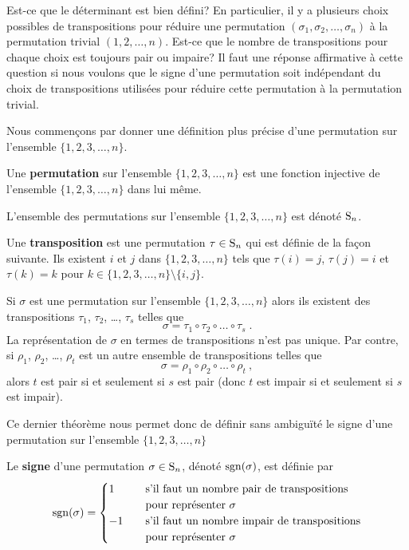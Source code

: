 {Est-ce que le déterminant est bien défini?  En particulier, il y a
plusieurs choix possibles de transpositions pour réduire une
permutation $(\sigma_1, \sigma_2, \ldots, \sigma_n)$ à la permutation
trivial $(1,2,\ldots,n)$.  Est-ce que le nombre de transpositions pour
chaque choix est toujours pair ou impaire?  Il faut une réponse
affirmative à cette question si nous voulons que le signe d'une permutation
soit indépendant du choix de transpositions utilisées pour réduire
cette permutation à la permutation trivial.

Nous commençons par donner une définition plus précise d'une permutation
sur l'ensemble $\{1,2,3,\ldots,n\}$.

\begin{focus}{\dfn}
Une {\bfseries permutation} sur l'ensemble
$\{1,2,3,\ldots,n\}$ est
une fonction injective de l'ensemble $\{1,2,3,\ldots,n\}$ dans lui
même.

L'ensemble des permutations sur l'ensemble $\{1,2,3,\ldots,n\}$ est
dénoté $\mathrm{S}_{n}$.

Une {\bfseries transposition} est une permutation
$\tau \in \mathrm{S}_{n}$ qui est définie de la façon suivante.  Ils existent
$i$ et $j$ dans $\{1,2,3,\ldots,n\}$ tels que $\tau(i) = j$, $\tau(j) = i$ et
$\tau(k) =k$ pour $k \in \{1,2,3,\ldots,n\} \setminus \{i,j\}$.
\end{focus}

\begin{focus}{\thm}
Si $\sigma$ est une permutation sur l'ensemble $\{1,2,3,\ldots,n\}$ alors ils
existent des transpositions $\tau_1$, $\tau_2$, \ldots, $\tau_s$ telles que
\[
\sigma = \tau_1 \circ \tau_2 \circ \ldots \circ \tau_s \; .
\]
La représentation de $\sigma$ en termes de transpositions n'est pas unique.
Par contre, si $\rho_1$, $\rho_2$, \ldots, $\rho_t$ est un autre ensemble de
transpositions telles que
\[
\sigma = \rho_1 \circ \rho_2 \circ \ldots \circ \rho_t \ ,
\]
alors $t$ est pair si et seulement si $s$ est pair (donc $t$ est impair si et
seulement si $s$ est impair).
\end{focus}

Ce dernier théorème nous permet donc de définir sans ambiguïté le signe d'une
permutation sur l'ensemble $\{1,2,3,\ldots,n\}$

\begin{focus}{\dfn} 
Le {\bfseries signe} d'une permutation $\sigma \in \mathrm{S}_{n}$, dénoté
$\operatorname{sgn}(\sigma)$, est définie par
\[
\operatorname{sgn}(\sigma) = \begin{cases}
1 & \quad \text{s'il faut un nombre pair de transpositions} \\
& \quad \text{pour représenter $\sigma$} \\
-1 & \quad \text{s'il faut un nombre impair de transposi\-tions} \\
& \quad \text{pour représenter $\sigma$}
\end{cases}
\]
\end{focus}

}
